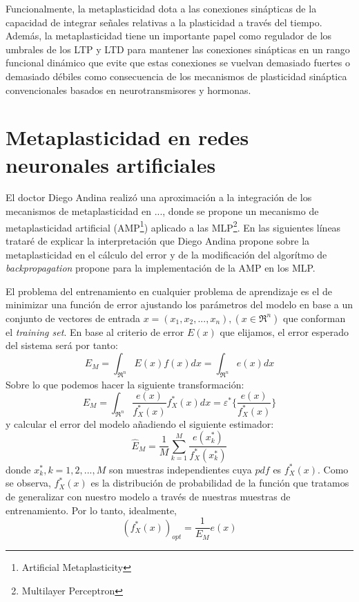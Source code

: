 \documentclass[10pt,a4paper]{report}
\begin{document}
Funcionalmente, la metaplasticidad dota a las conexiones sinápticas de la capacidad de integrar señales relativas a la plasticidad a través del tiempo. Además, la metaplasticidad tiene un importante papel como regulador de los umbrales de los LTP y LTD para mantener las conexiones sinápticas en un rango funcional dinámico que evite que estas conexiones se vuelvan demasiado fuertes o demasiado débiles como consecuencia de los mecanismos de plasticidad sináptica convencionales basados en neurotransmisores y hormonas.

\section{Metaplasticidad en redes neuronales artificiales}
El doctor Diego Andina realizó una aproximación a la integración de los mecanismos de metaplasticidad en ..., donde se propone un mecanismo de metaplasticidad artificial (AMP\footnote{Artificial Metaplasticity}) aplicado a las MLP\footnote{Multilayer Perceptron}. En las siguientes líneas trataré de explicar la interpretación que Diego Andina propone sobre la metaplasticidad en el cálculo del error y de la modificación del algorítmo de \textit{backpropagation} propone para la implementación de la AMP en los MLP.

El problema del entrenamiento en cualquier problema de aprendizaje es el de minimizar una función de error ajustando los parámetros del modelo en base a un conjunto de vectores de entrada $x=(x_1,x_2,...,x_n),(x\in\Re^n)$ que conforman el \textit{training set}. En base al criterio de error $E(x)$ que elijamos, el error esperado del sistema será por tanto:
\begin{equation}
	E_M = \int_{\Re^n}E(x)f(x)dx = \int_{\Re^n}e(x)dx
\end{equation} 
Sobre lo que podemos hacer la siguiente transformación:
\begin{equation}
	\label{metaSub1}
	E_M = \int_{\Re^n}\dfrac{e(x)}{f^*_X(x)}f^*_X(x)dx = \varepsilon^*\lbrace\dfrac{e(x)}{f^*_X(x)}\rbrace
\end{equation}
y calcular el error del modelo añadiendo el siguiente estimador:
\begin{equation}
	\label{metaSub2}
	\widehat{E}_M=\dfrac{1}{M}\sum^M_{k=1}\dfrac{e(x^*_k)}{f^*_X(x^*_k)}
\end{equation}
donde $x^*_k,k=1,2,...,M$ son muestras independientes cuya $pdf$ es $f^*_X(x)$. Como se observa, $f^*_X(x)$ es la distribución de probabilidad de la función que tratamos de generalizar con nuestro modelo a través de nuestras muestras de entrenamiento. Por lo tanto, idealmente, 
\begin{equation}
	\label{metaSub3}
	(f^*_X(x))_{opt}=\dfrac{1}{E_M}e(x)
\end{equation}
\end{document}
